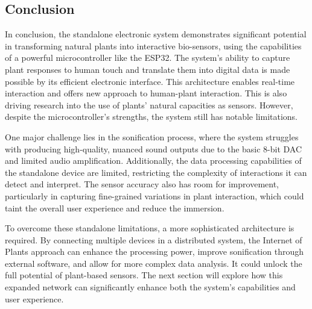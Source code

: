 \subsection{Conclusion}

In conclusion, the standalone electronic system demonstrates significant potential in transforming natural plants into interactive bio-sensors, using the capabilities of a powerful microcontroller like the ESP32. The system's ability to capture plant responses to human touch and translate them into digital data is made possible by its efficient electronic interface. This architecture enables real-time interaction and offers new approach to human-plant interaction. This is also driving research into the use of plants' natural capacities as sensors. However, despite the microcontroller's strengths, the system still has notable limitations.

One major challenge lies in the sonification process, where the system struggles with producing high-quality, nuanced sound outputs due to the basic 8-bit DAC and limited audio amplification. Additionally, the data processing capabilities of the standalone device are limited, restricting the complexity of interactions it can detect and interpret. The sensor accuracy also has room for improvement, particularly in capturing fine-grained variations in plant interaction, which could taint the overall user experience and reduce the immersion.

To overcome these standalone limitations, a more sophisticated architecture is required. By connecting multiple devices in a distributed system, the Internet of Plants approach can enhance the processing power, improve sonification through external software, and allow for more complex data analysis. It could unlock the  full potential of plant-based sensors. The next section will explore how this expanded network can significantly enhance both the system's capabilities and user experience.
